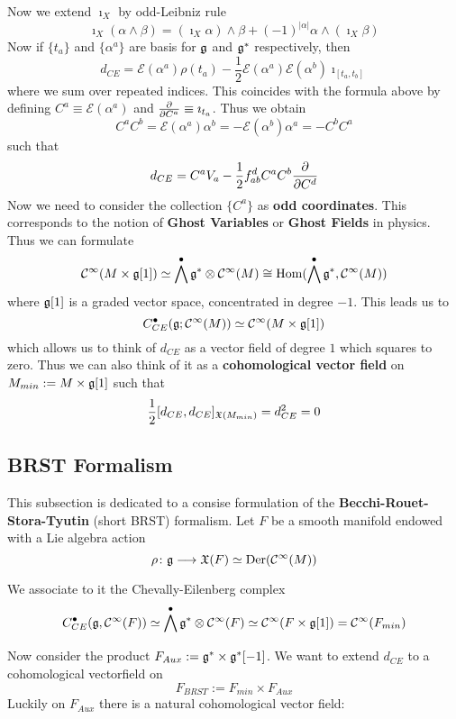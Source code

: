 Now we extend $\imath_X$ by odd-Leibniz rule
$$ \imath_X(\alpha \wedge \beta) = (\imath_X \alpha) \wedge \beta + (-1)^{|\alpha|} \alpha \wedge (\imath_X \beta) $$
Now if $\{t_a\}$ and $\{\alpha^a\}$ are basis for $\mathfrak{g}$ and $\mathfrak{g}^*$ respectively, then
$$ d_{CE} = \mathcal{E}(\alpha^a) \rho(t_a) - \frac{1}{2} \mathcal{E}(\alpha^a) \mathcal{E}(\alpha^b) \imath_{[t_a, t_b]} $$
where we sum over repeated indices. This coincides with the formula above by defining $C^a \equiv \mathcal{E}(\alpha^a)$ and $\frac{\partial }{\partial C^a} \equiv \imath_{t_a}$. Thus we obtain
$$ C^a C^b = \mathcal{E}(\alpha^a) \alpha^b = - \mathcal{E}(\alpha^b) \alpha^a = - C^b C^a $$
such that
$$ d_{CE} = C^a V_a - \frac{1}{2} f_{ab}^d C^a C^b \frac{\partial }{\partial C^d} $$
Now we need to consider the collection $\{C^a\}$ as \textbf{odd coordinates}. This corresponds to the notion of \textbf{Ghost Variables} or \textbf{Ghost Fields} in physics. Thus we can formulate
$$ \mathcal{C}^{\infty}(M \times \mathfrak{g}[1]) \simeq \bigwedge^\bullet \mathfrak{g}^* \otimes \mathcal{C}^{\infty}(M) \cong \operatorname{Hom}(\bigwedge^\bullet \mathfrak{g}^*, \mathcal{C}^{\infty}(M)) $$
where $\mathfrak{g}[1]$ is a graded vector space, concentrated in degree $-1$. This leads us to
$$ C_{CE}^\bullet (\mathfrak{g} ; \mathcal{C}^{\infty}(M)) \simeq \mathcal{C}^{\infty}(M \times \mathfrak{g}[1]) $$
which allows us to think of $d_{CE}$ as a vector field of degree $1$ which squares to zero. Thus we can also think of it as a \textbf{cohomological vector field} on $M_{min}:=M \times \mathfrak{g}[1]$ such that
$$ \frac{1}{2} [d_{CE}, d_{CE}]_{\mathfrak{X}(M_{min})} = d_{CE}^2 = 0 $$

\subsection{BRST Formalism}

This subsection is dedicated to a consise formulation of the \textbf{Becchi-Rouet-Stora-Tyutin} (short BRST) formalism. Let $F$ be a smooth manifold endowed with a Lie algebra action
\begin{equation}
  \rho \colon \mathfrak{g} \longrightarrow \mathfrak{X}(F) \simeq \operatorname{Der}(\mathcal{C}^{\infty}(M))
\end{equation}

We associate to it the Chevally-Eilenberg complex
\begin{equation}
  C_{CE}^\bullet (\mathfrak{g}, \mathcal{C}^{\infty}(F)) \simeq \bigwedge^\bullet \mathfrak{g}^* \otimes \mathcal{C}^{\infty}(F) \simeq \mathcal{C}^{\infty}(F \times \mathfrak{g}[1]) = \mathcal{C}^{\infty}(F_{min})
\end{equation}

Now consider the product $F_{Aux} := \mathfrak{g}^* \times \mathfrak{g}^*[-1]$. We want to extend $d_{CE}$ to a cohomological vectorfield on
$$ F_{BRST} := F_{min} \times F_{Aux} $$
Luckily on $F_{Aux}$ there is a natural cohomological vector field:

